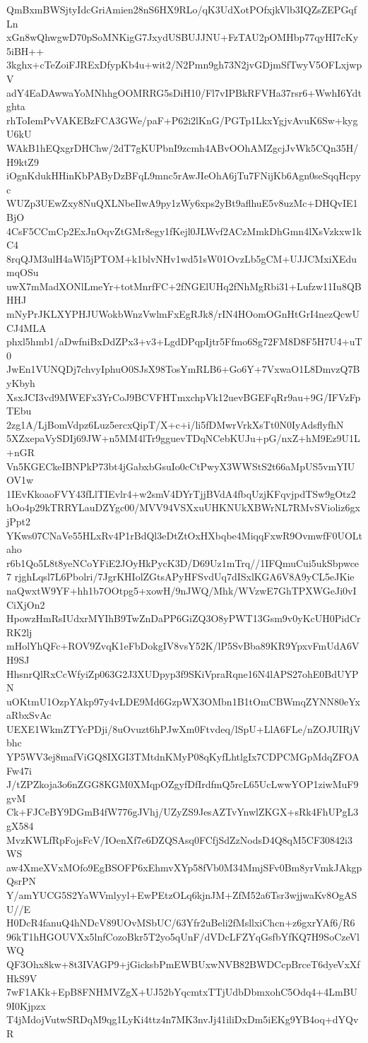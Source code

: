 QmBxmBWSjtyIdcGriAmien28nS6HX9RLo/qK3UdXotPOfxjkVlb3IQZsZEPGqfLn
xGn8wQhwgwD70pSoMNKigG7JxydUSBUJJNU+FzTAU2pOMHbp77qyHI7cKy5iBH++
3kghx+cTeZoiFJRExDfypKb4u+wit2/N2Pmn9gh73N2jvGDjmSfTwyV5OFLxjwpV
adY4EaDAwwaYoMNhhgOOMRRG5sDiH10/Fl7vIPBkRFVHa37rsr6+WwhI6Ydtghta
rhToIemPvVAKEBzFCA3GWe/paF+P62i2lKnG/PGTp1LkxYgjvAvuK6Sw+kygU6kU
WAkB1hEQxgrDHChw/2dT7gKUPbnI9zcmh4ABvOOhAMZgcjJvWk5CQn35H/H9ktZ9
iOgnKdukHHinKbPAByDzBFqL9mnc5rAwJIeOhA6jTu7FNijKb6Agn0seSqqHcpyc
WUZp3UEwZxy8NuQXLNbeIlwA9py1zWy6xps2yBt9aflhuE5v8uzMc+DHQvIE1BjO
4CsF5CCmCp2ExJnOqvZtGMr8egy1fKejl0JLWvf2ACzMmkDhGmn4lXsVzkxw1kC4
8rqQJM3ulH4aWl5jPTOM+k1blvNHv1wd51sW01OvzLb5gCM+UJJCMxiXEdumqOSu
uwX7mMadXONlLmeYr+totMnrfFC+2fNGElUHq2fNhMgRbi31+Lufzw11Iu8QBHHJ
mNyPrJKLXYPHJUWokbWnzVwlmFxEgRJk8/rIN4HOomOGnHtGrI4nezQcwUCJ4MLA
phxl5hmb1/aDwfniBxDdZPx3+v3+LgdDPqpIjtr5Ffmo6Sg72FM8D8F5H7U4+uT0
JwEn1VUNQDj7chvyIphuO0SJsX98TosYmRLB6+Go6Y+7VxwaO1L8DmvzQ7ByKbyh
XsxJCI3vd9MWEFx3YrCoJ9BCVFHTmxchpVk12uevBGEFqRr9au+9G/IFVzFpTEbu
2zg1A/LjBomVdpz6Luz5ercxQipT/X+c+i/li5fDMwrVrkXsTt0N0IyAdsflyfhN
5XZxepaVySDIj69JW+n5MM4lTr9gguevTDqNCebKUJu+pG/nxZ+hM9Ez9U1L+nGR
Vn5KGECkeIBNPkP73bt4jGabxbGsuIo0cCtPwyX3WWStS2t66aMpUS5vmYIUOV1w
1IEvKkoaoFVY43fLlTIEvlr4+w2smV4DYrTjjBVdA4fbqUzjKFqvjpdTSw9gOtz2
hOo4p29kTRRYLauDZYgc00/MVV94VSXxuUHKNUkXBWrNL7RMvSVioliz6gxjPpt2
YKws07CNaVe55HLxRv4P1rBdQl3eDtZtOxHXbqbe4MiqqFxwR9OvmwfF0UOLtaho
r6b1Qo5L8t8yeNCoYFiE2JOyHkPycK3D/D69Uz1mTrq//1IFQmuCui5ukSbpwce7
rjghLqsl7L6Pbolri/7JgrKHIolZGtsAPyHFSvdUq7dISxlKGA6V8A9yCL5eJKie
naQwxtW9YF+hh1b7OOtpg5+xowH/9nJWQ/Mhk/WVzwE7GhTPXWGeJi0vICiXjOn2
HpowzHmRsIUdxrMYIhB9TwZnDaPP6GiZQ3O8yPWT13Gsm9v0yKcUH0PidCrRK2lj
mHolYhQFc+ROV9ZvqK1eFbDokgIV8vsY52K/lP5SvBba89KR9YpxvFmUdA6VH9SJ
HhsnrQlRxCcWfyiZp063G2J3XUDpyp3f9SKiVpraRqne16N4lAPS27ohE0BdUYPN
uOKtmU1OzpYAkp97y4vLDE9Md6GzpWX3OMbn1B1tOmCBWmqZYNN80eYxaRbxSvAc
UEXE1WkmZTYcPDji/8uOvuzt6hPJwXm0Ftvdeq/lSpU+LlA6FLe/nZOJUIRjVbhc
YP5WV3ej8mafViGQ8IXGI3TMtdnKMyP08qKyfLhtlgIx7CDPCMGpMdqZFOAFw47i
J/tZPZkoja3o6nZGG8KGM0XMqpOZgyfDfIrdfmQ5rcL65UcLwwYOP1ziwMuF9gvM
Ck+FJCeBY9DGmB4fW776gJVhj/UZyZS9JesAZTvYnwlZKGX+sRk4FhUPgL3gX584
MvzKWLfRpFojsFcV/IOenXf7e6DZQSAsq0FCfjSdZzNodsD4Q8qM5CF30842i3WS
aw4XmeXVxMOfo9EgBSOFP6xEhmvXYp58fVb0M34MmjSFv0Bm8yrVmkJAkgpQsrPN
Y/amYUCG5S2YaWVmlyyl+EwPEtzOLq6kjnJM+ZfM52a6Tsr3wjjwaKv8OgASU//E
H0DcR4fanuQ4hNDcV89UOvMSbUC/63Yfr2uBeli2fMsllxiChcn+z6gxrYAf6/R6
96kT1hHGOUVXx5lnfCozoBkr5T2yo5qUnF/dVDcLFZYqGsfbYfKQ7H9SoCzeVlWQ
QF3Ohx8kw+8t3IVAGP9+jGicksbPmEWBUxwNVB82BWDCcpBrceT6dyeVxXfHkS9V
7wF1AKk+EpB8FNHMVZgX+UJ52bYqcmtxTTjUdbDbmxohC5Odq4+4LmBU9I0Kjpzx
T4jMdojVutwSRDqM9qg1LyKi4ttz4n7MK3nvJj41iliDxDm5iEKg9YB4oq+dYQvR

